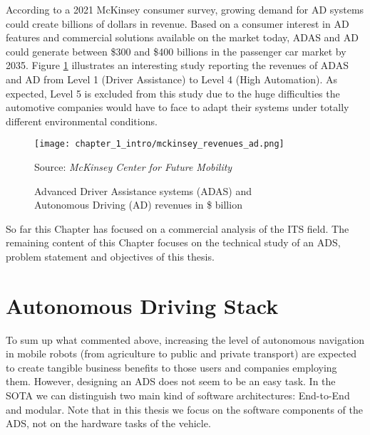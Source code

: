
According to a 2021 McKinsey consumer survey, growing demand for \ac{AD} systems could create billions of dollars in revenue. Based on a consumer interest in \ac{AD} features and commercial solutions available on the market today, ADAS and AD could generate between \$300 and \$400 billions in the passenger car market by 2035. Figure \ref{fig:chapter_1_intro/mckinsey_revenues_ad} illustrates an interesting study reporting the revenues of \ac{ADAS} and \ac{AD}  from Level 1 (Driver Assistance) to Level 4 (High Automation). As expected, Level 5 is excluded from this study due to the huge difficulties the automotive companies would have to face to adapt their systems under totally different environmental conditions.

\begin{figure}[h]
	\centering
	\texttt{[image: chapter\_1\_intro/mckinsey\_revenues\_ad.png]}
	\caption{Advanced Driver Assistance systems (ADAS) and \\ Autonomous Driving (AD) revenues in \$ billion} Source: \textit{McKinsey Center for Future Mobility}
	\label{fig:chapter_1_intro/mckinsey_revenues_ad}
\end{figure}

So far this Chapter has focused on a commercial analysis of the \ac{ITS} field. The remaining content of this Chapter focuses on the technical study of an \ac{ADS}, problem statement and objectives of this thesis.

\section{Autonomous Driving Stack}
\label{sec:1_ad_architecture}

To sum up what commented above, increasing the level of autonomous navigation in mobile robots (from agriculture to public and private transport) are expected to create tangible business benefits to those users and companies employing them. However, designing an \ac{ADS} does not seem to be an easy task. In the \ac{SOTA} we can distinguish two main kind of software architectures: End-to-End and modular. Note that in this thesis we focus on the software components of the \ac{ADS}, not on the hardware tasks of the vehicle. 

